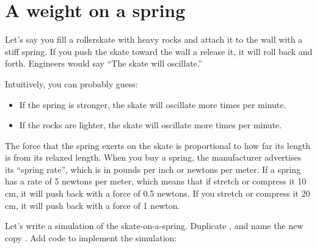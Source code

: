 \section{A weight on a spring}

Let's say you fill a rollerskate with heavy rocks and attach it to the
wall with a stiff spring.  If you push the skate toward the wall a
release it, it will roll back and forth. Engineers would say ``The skate will oscillate.''

Intuitively, you can probably guess:
\begin{itemize}
\item If the spring is stronger, the skate will oscillate more times per minute.
\item If the rocks are lighter, the skate will oscillate more times per minute.
\end{itemize}

The force that the spring exerts on the skate is proportional to how
far its length is from its relaxed length. When you buy a spring, the
manufacturer advertises its ``spring rate'', which is in pounds per
inch or newtons per meter.  If a spring has a rate of 5 newtons per
meter, which means that if stretch or compress it 10 cm, it will push
back with a force of 0.5 newtons. If you stretch or compress it 20 cm,
it will push back with a force of 1 newton.

Let's write a simulation of the skate-on-a-spring. Duplicate , and name the new copy .  Add code to implement the simulation:

